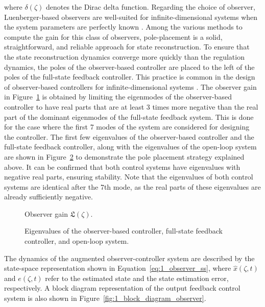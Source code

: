 where $\delta(\zeta)$ denotes the Dirac delta function. Regarding the choice of observer, Luenberger-based observers are well-suited for infinite-dimensional systems when the system parameters are perfectly known \autocite{Ali2015Review}. Among the various methods to compute the gain for this class of observers, pole-placement is a solid, straightforward, and reliable approach for state reconstruction. To ensure that the state reconstruction dynamics converge more quickly than the regulation dynamics, the poles of the observer-based controller are placed to the left of the poles of the full-state feedback controller. This practice is common in the design of observer-based controllers for infinite-dimensional systems \autocite{Morris2020Controller}. The observer gain in Figure~\ref{fig:1_L_modes} is obtained by limiting the eigenmodes of the observer-based controller to have real parts that are at least 3 times more negative than the real part of the dominant eigenmodes of the full-state feedback system. This is done for the case where the first 7 modes of the system are considered for designing the controller. The first few eigenvalues of the observer-based controller and the full-state feedback controller, along with the eigenvalues of the open-loop system are shown in Figure~\ref{fig:1_eigs} to demonstrate the pole placement strategy explained above. It can be confirmed that both control systems have eigenvalues with negative real parts, ensuring stability. Note that the eigenvalues of both control systems are identical after the 7th mode, as the real parts of these eigenvalues are already sufficiently negative.

\begin{figure}[!htbp]
    \centering
    
    \caption{Observer gain $\mathfrak{L}(\zeta)$.}
    \label{fig:1_L_modes}
\end{figure}

\begin{figure}[!htbp]
    \centering
    
    \caption{Eigenvalues of the observer-based controller, full-state feedback controller, and open-loop system.}
    \label{fig:1_eigs}
\end{figure}

The dynamics of the augmented observer-controller system are described by the state-space representation shown in Equation~\ref{eq:1_observer_ss}, where $\hat{{x}}(\zeta, t)$ and ${e}(\zeta, t)$ refer to the estimated state and the state estimation error, respectively. A block diagram representation of the output feedback control system is also shown in Figure~\ref{fig:1_block_diagram_observer}.

